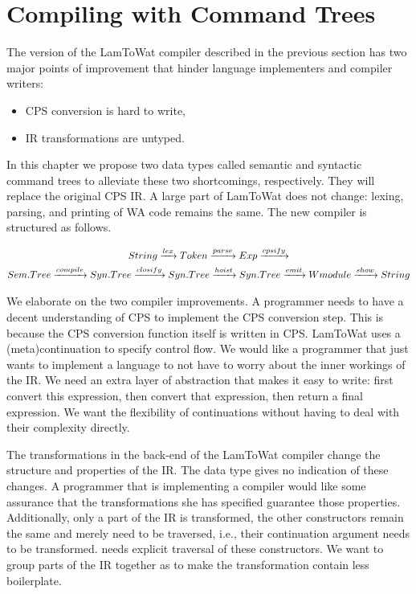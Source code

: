 
\chapter{\label{chap:treecomp}Compiling with Command Trees}
The version of the LamToWat compiler described in the previous section has two major points of improvement that hinder language implementers and compiler writers:

\begin{itemize}
\item \ac{CPS} conversion is hard to write,
\item \ac{IR} transformations are untyped.
\end{itemize}

In this chapter we propose two data types called semantic and syntactic command trees to alleviate these two shortcomings, respectively. They will replace the original \ac{CPS} \ac{IR}. A large part of LamToWat does not change: lexing, parsing, and printing of \ac{WA} code remains the same. The new compiler is structured as follows.

\begin{gather*}
  String \xrightarrow{lex} Token \xrightarrow{parse} Exp \xrightarrow{cpsify}\\
  Sem.Tree \xrightarrow{compile} Syn.Tree \xrightarrow{closify} Syn.Tree \xrightarrow{hoist} Syn.Tree \xrightarrow{emit} Wmodule \xrightarrow{show} String
\end{gather*}

We elaborate on the two compiler improvements. A programmer needs to have a decent understanding of \ac{CPS} to implement the \ac{CPS} conversion step. This is because the \ac{CPS} conversion function itself is written in \ac{CPS}. LamToWat uses a (meta)continuation to specify control flow. We would like a programmer that just wants to implement a language to not have to worry about the inner workings of the \ac{IR}. We need an extra layer of abstraction that makes it easy to write: first convert this expression, then convert that expression, then return a final expression. We want the flexibility of continuations without having to deal with their complexity directly.

The transformations in the back-end of the LamToWat compiler change the structure and properties of the \ac{IR}. The  data type gives no indication of these changes. A programmer that is implementing a compiler would like some assurance that the transformations she has specified guarantee those properties. Additionally, only a part of the \ac{IR} is transformed, the other constructors remain the same and merely need to be traversed, i.e., their continuation argument needs to be transformed.  needs explicit traversal of these constructors. We want to group parts of the \ac{IR} together as to make the transformation contain less boilerplate.

